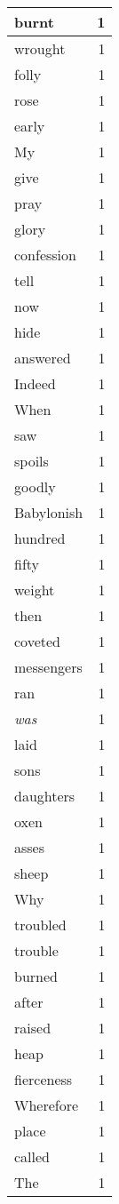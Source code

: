 \begin{center}
\begin{longtable}{l|r}
burnt & 1\\ \hline 
wrought & 1\\ \hline 
folly & 1\\ \hline 
rose & 1\\ \hline 
early & 1\\ \hline 
My & 1\\ \hline 
give & 1\\ \hline 
pray & 1\\ \hline 
glory & 1\\ \hline 
confession & 1\\ \hline 
tell & 1\\ \hline 
now & 1\\ \hline 
hide & 1\\ \hline 
answered & 1\\ \hline 
Indeed & 1\\ \hline 
When & 1\\ \hline 
saw & 1\\ \hline 
spoils & 1\\ \hline 
goodly & 1\\ \hline 
Babylonish & 1\\ \hline 
hundred & 1\\ \hline 
fifty & 1\\ \hline 
weight & 1\\ \hline 
then & 1\\ \hline 
coveted & 1\\ \hline 
messengers & 1\\ \hline 
ran & 1\\ \hline 
\emph{was} & 1\\ \hline 
laid & 1\\ \hline 
sons & 1\\ \hline 
daughters & 1\\ \hline 
oxen & 1\\ \hline 
asses & 1\\ \hline 
sheep & 1\\ \hline 
Why & 1\\ \hline 
troubled & 1\\ \hline 
trouble & 1\\ \hline 
burned & 1\\ \hline 
after & 1\\ \hline 
raised & 1\\ \hline 
heap & 1\\ \hline 
fierceness & 1\\ \hline 
Wherefore & 1\\ \hline 
place & 1\\ \hline 
called & 1\\ \hline 
The & 1\\ \hline 
\end{longtable}
\end{center}



